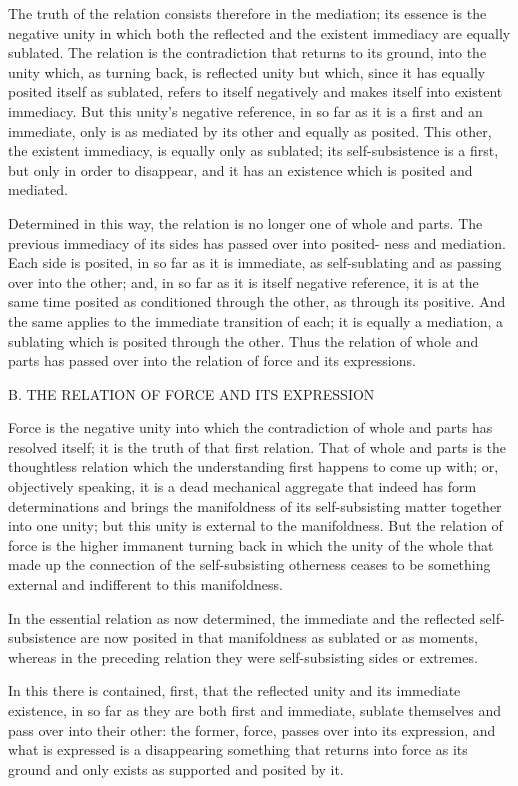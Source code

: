 The truth of the relation consists therefore in the mediation; its essence is
the negative unity in which both the reflected and the existent immediacy
are equally sublated. The relation is the contradiction that returns to its
ground, into the unity which, as turning back, is reflected unity but which,
since it has equally posited itself as sublated, refers to itself negatively and
makes itself into existent immediacy. But this unity's negative reference, in
so far as it is a first and an immediate, only is as mediated by its other and
equally as posited. This other, the existent immediacy, is equally only as
sublated; its self-subsistence is a first, but only in order to disappear, and it
has an existence which is posited and mediated.

Determined in this way, the relation is no longer one of whole and
parts. The previous immediacy of its sides has passed over into posited-
ness and mediation. Each side is posited, in so far as it is immediate, as
self-sublating and as passing over into the other; and, in so far as it is itself
negative reference, it is at the same time posited as conditioned through
the other, as through its positive. And the same applies to the immediate
transition of each; it is equally a mediation, a sublating which is posited
through the other.
Thus the relation of whole and parts has passed over
into the relation of force and its expressions.

B. THE RELATION OF FORCE AND ITS EXPRESSION

Force is the negative unity into which
the contradiction of whole and parts has resolved itself;
it is the truth of that first relation.
That of whole and parts is the thoughtless relation
which the understanding first happens to come up with;
or, objectively speaking, it is a dead mechanical aggregate
that indeed has form determinations
and brings the manifoldness of
its self-subsisting matter together into one unity;
but this unity is external to the manifoldness.
But the relation of force is the higher immanent turning back
in which the unity of the whole that made up the connection
of the self-subsisting otherness ceases to be something external
and indifferent to this manifoldness.

In the essential relation as now determined,
the immediate and the reflected self-subsistence are
now posited in that manifoldness as sublated or as moments,
whereas in the preceding relation they were self-subsisting
sides or extremes.

In this there is contained, first, that the reflected unity
and its immediate existence, in so far as they are both first and immediate,
sublate themselves and pass over into their other:
the former, force, passes over into its expression,
and what is expressed is a disappearing something
that returns into force as its ground
and only exists as supported and posited by it.

